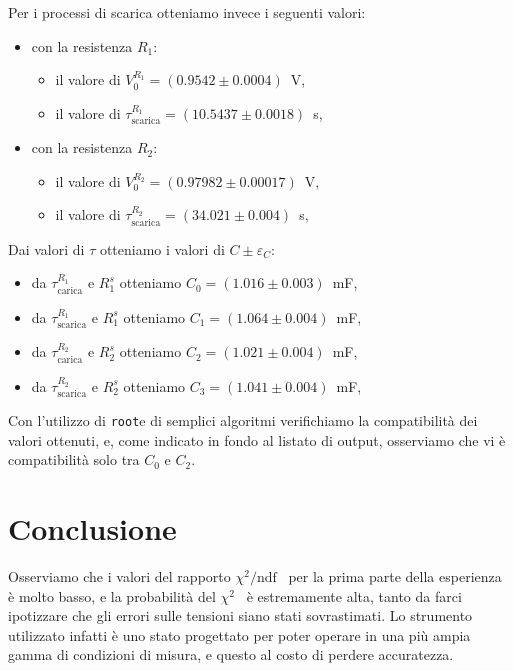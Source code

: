 \documentclass[
    reprint, 
    superscriptaddress, 
    altaffilletter, 
    amsmath, 
    amssymb, 
    a4paper
]{revtex4-2}
\newcommand{\ChiSqr}{$\chi^2$\space}
\newcommand{\ChiNdf}{$\chi^2/\text{ndf}$}
\newcommand{\cernroot}{\texttt{root}}
\newcommand{\mstdErr}[1]{\varepsilon_{#1}}
\begin{document}
    Per i processi di scarica otteniamo invece i seguenti valori:
    \begin{itemize}
        \item con la resistenza $R_1$:
        \begin{itemize}
            \item il valore di $V_0^{R_1}=(0.9542\pm0.0004)$~V, 
            \item il valore di $\tau^{R_1}_{\text{scarica}}=(10.5437\pm0.0018)$~s, 
        \end{itemize}
        \item con la resistenza $R_2$:
        \begin{itemize}
            \item il valore di $V_0^{R_2}=(0.97982\pm0.00017)$~V,
            \item il valore di $\tau^{R_2}_{\text{scarica}}=(34.021\pm0.004)$~s,
        \end{itemize}
    \end{itemize}
    
    Dai valori di $\tau$ otteniamo i valori di $C\pm\mstdErr{C}$:
    \begin{itemize}
        \item da $\tau^{R_1}_{\text{carica}}$ e $R_1^s$ otteniamo $C_0=(1.016\pm0.003)$~mF,
        \item da $\tau^{R_1}_{\text{scarica}}$ e $R_1^s$ otteniamo $C_1=(1.064\pm0.004)$~mF,
        \item da $\tau^{R_2}_{\text{carica}}$ e $R_2^s$ otteniamo $C_2=(1.021\pm0.004)$~mF,
        \item da $\tau^{R_2}_{\text{scarica}}$ e $R_2^s$ otteniamo $C_3=(1.041\pm0.004)$~mF,
    \end{itemize}
    
    Con l'utilizzo di \cernroot e di semplici algoritmi verifichiamo la compatibilità dei valori ottenuti, e, come indicato in fondo al listato di output, osserviamo che vi è compatibilità solo tra $C_0$ e $C_2$.
    
    \section{Conclusione}
    \label{section:conclusion}
    
    Osserviamo che i valori del rapporto \ChiNdf~ per la prima parte della esperienza è molto basso, e la probabilità del \ChiSqr~ è estremamente alta, tanto da farci ipotizzare che gli errori sulle tensioni siano stati sovrastimati. Lo strumento utilizzato infatti è uno stato progettato per poter operare in una più ampia gamma di condizioni di misura, e questo al costo di perdere accuratezza.
    
\end{document}

